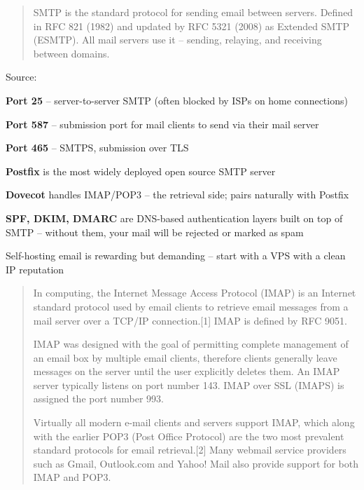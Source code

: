 \documentclass[Screen16to9,17pt]{foils}
\begin{document}

\begin{quote}
SMTP is the standard protocol for sending email between servers.
Defined in RFC 821 (1982) and updated by RFC 5321 (2008) as Extended SMTP (ESMTP).
All mail servers use it -- sending, relaying, and receiving between domains.
\end{quote}

Source: 

\begin{list2}
\item {\bf Port 25} -- server-to-server SMTP (often blocked by ISPs on home connections)
\item {\bf Port 587} -- submission port for mail clients to send via their mail server
\item {\bf Port 465} -- SMTPS, submission over TLS
\item {\bf Postfix} is the most widely deployed open source SMTP server 
\item {\bf Dovecot} handles IMAP/POP3 -- the retrieval side; pairs naturally with Postfix 
\item {\bf SPF, DKIM, DMARC} are DNS-based authentication layers built on top of SMTP --
without them, your mail will be rejected or marked as spam
\item Self-hosting email is rewarding but demanding -- start with a VPS with a clean IP reputation
\end{list2}

\begin{quote}
In computing, the Internet Message Access Protocol (IMAP) is an Internet standard protocol used by email clients to retrieve email messages from a mail server over a TCP/IP connection.[1] IMAP is defined by RFC 9051.

IMAP was designed with the goal of permitting complete management of an email box by multiple email clients, therefore clients generally leave messages on the server until the user explicitly deletes them. An IMAP server typically listens on port number 143. IMAP over SSL (IMAPS) is assigned the port number 993.

Virtually all modern e-mail clients and servers support IMAP, which along with the earlier POP3 (Post Office Protocol) are the two most prevalent standard protocols for email retrieval.[2] Many webmail service providers such as Gmail, Outlook.com and Yahoo! Mail also provide support for both IMAP and POP3.
\end{quote}
\end{document}
